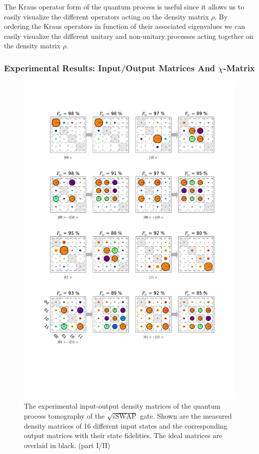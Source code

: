 \smallskip

The Kraus operator form of the quantum process is useful since it allows us to easily visualize the different operators acting on the density matrix $\rho$. By ordering the Kraus operators in function of their associated eigenvalues we can easily visualize the different unitary and non-unitary processes acting together on the density matrix $\rho$.

\subsubsection{Experimental Results: Input/Output Matrices And $\chi$-Matrix}

\begin{figure}[p]
	\centering
		\includegraphics[width=1.0\textwidth]{"./data/ct5/2011_04_21 - grover and tomo/good_data/process -matrices 1"}
	\caption{The experimental input-output density matrices of the quantum process tomography of the $\sqrt{i\mathrm{SWAP}}$ gate. Shown are the measured density matrices of 16 different input states and the corresponding output matrices with their state fidelities. The ideal matrices are overlaid in black. (part I/II)}
	\label{fig:process_matrices_1}
\end{figure}

